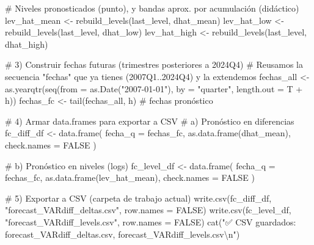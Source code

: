\documentclass[
  spanish,
  letterpaper,
  DIV=11,
  numbers=noendperiod]{scrartcl}
\newenvironment{Shaded}{\begin{snugshade}}{\end{snugshade}}
\newcommand{\AttributeTok}[1]{\textcolor[rgb]{0.40,0.45,0.13}{#1}}
\newcommand{\CommentTok}[1]{\textcolor[rgb]{0.37,0.37,0.37}{#1}}
\newcommand{\ConstantTok}[1]{\textcolor[rgb]{0.56,0.35,0.01}{#1}}
\newcommand{\FunctionTok}[1]{\textcolor[rgb]{0.28,0.35,0.67}{#1}}
\newcommand{\NormalTok}[1]{\textcolor[rgb]{0.00,0.23,0.31}{#1}}
\newcommand{\OtherTok}[1]{\textcolor[rgb]{0.00,0.23,0.31}{#1}}
\newcommand{\SpecialCharTok}[1]{\textcolor[rgb]{0.37,0.37,0.37}{#1}}
\newcommand{\StringTok}[1]{\textcolor[rgb]{0.13,0.47,0.30}{#1}}
\begin{document}
\begin{Shaded}
\begin{Highlighting}[]
\CommentTok{\# Niveles pronosticados (punto), y bandas aprox. por acumulación (didáctico)}
\NormalTok{lev\_hat\_mean }\OtherTok{\textless{}{-}} \FunctionTok{rebuild\_levels}\NormalTok{(last\_level, dhat\_mean)}
\NormalTok{lev\_hat\_low  }\OtherTok{\textless{}{-}} \FunctionTok{rebuild\_levels}\NormalTok{(last\_level, dhat\_low)}
\NormalTok{lev\_hat\_high }\OtherTok{\textless{}{-}} \FunctionTok{rebuild\_levels}\NormalTok{(last\_level, dhat\_high)}

\CommentTok{\# 3) Construir fechas futuras (trimestres posteriores a 2024Q4)}
\CommentTok{\#    Reusamos la secuencia "fechas" que ya tienes (2007Q1..2024Q4) y la extendemos}
\NormalTok{fechas\_all }\OtherTok{\textless{}{-}} \FunctionTok{as.yearqtr}\NormalTok{(}\FunctionTok{seq}\NormalTok{(}\AttributeTok{from =} \FunctionTok{as.Date}\NormalTok{(}\StringTok{"2007{-}01{-}01"}\NormalTok{), }\AttributeTok{by =} \StringTok{"quarter"}\NormalTok{, }\AttributeTok{length.out =}\NormalTok{ T }\SpecialCharTok{+}\NormalTok{ h))}
\NormalTok{fechas\_fc  }\OtherTok{\textless{}{-}} \FunctionTok{tail}\NormalTok{(fechas\_all, h)  }\CommentTok{\# fechas pronóstico}

\CommentTok{\# 4) Armar data.frames para exportar a CSV}
\CommentTok{\# a) Pronóstico en diferencias}
\NormalTok{fc\_diff\_df }\OtherTok{\textless{}{-}} \FunctionTok{data.frame}\NormalTok{(}
  \AttributeTok{fecha\_q =}\NormalTok{ fechas\_fc,}
  \FunctionTok{as.data.frame}\NormalTok{(dhat\_mean),}
  \AttributeTok{check.names =} \ConstantTok{FALSE}
\NormalTok{)}

\CommentTok{\# b) Pronóstico en niveles (logs)}
\NormalTok{fc\_level\_df }\OtherTok{\textless{}{-}} \FunctionTok{data.frame}\NormalTok{(}
  \AttributeTok{fecha\_q =}\NormalTok{ fechas\_fc,}
  \FunctionTok{as.data.frame}\NormalTok{(lev\_hat\_mean),}
  \AttributeTok{check.names =} \ConstantTok{FALSE}
\NormalTok{)}

\CommentTok{\# 5) Exportar a CSV (carpeta de trabajo actual)}
\FunctionTok{write.csv}\NormalTok{(fc\_diff\_df,  }\StringTok{"forecast\_VARdiff\_deltas.csv"}\NormalTok{, }\AttributeTok{row.names =} \ConstantTok{FALSE}\NormalTok{)}
\FunctionTok{write.csv}\NormalTok{(fc\_level\_df, }\StringTok{"forecast\_VARdiff\_levels.csv"}\NormalTok{, }\AttributeTok{row.names =} \ConstantTok{FALSE}\NormalTok{)}
\FunctionTok{cat}\NormalTok{(}\StringTok{"✅ CSV guardados: forecast\_VARdiff\_deltas.csv, forecast\_VARdiff\_levels.csv}\SpecialCharTok{\textbackslash{}n}\StringTok{"}\NormalTok{)}
\end{Highlighting}
\end{Shaded}
\end{document}
